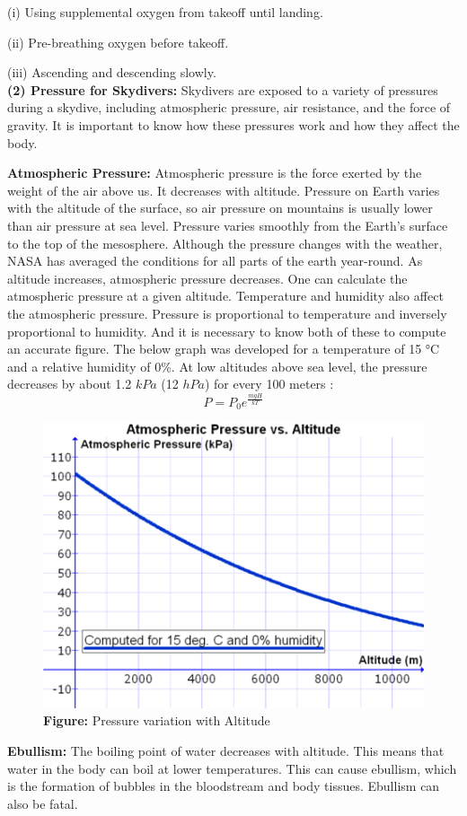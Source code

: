 \documentclass[a4paper, 14pt]{extarticle}
\begin{document}
\textup{(i)} Using supplemental oxygen from takeoff until landing.

\textup{(ii)} Pre-breathing oxygen before takeoff.

\textup{(iii)} Ascending and descending slowly.\\
\textbf{(2) Pressure for Skydivers:}
Skydivers are exposed to a variety of pressures during a skydive, including atmospheric pressure, air resistance, and the force of gravity. It is important to know how these pressures work and how they affect the body.

\textbf{Atmospheric Pressure:}
Atmospheric pressure is the force exerted by the weight of the air above us. It decreases with altitude.
Pressure on Earth varies with the altitude of the surface, so air pressure on mountains is usually lower than air pressure at sea level. Pressure varies smoothly from the Earth's surface to the top of the mesosphere. Although the pressure changes with the weather, NASA has averaged the conditions for all parts of the earth year-round. As altitude increases, atmospheric pressure decreases. One can calculate the atmospheric pressure at a given altitude. Temperature and humidity also affect the atmospheric pressure. Pressure is proportional to temperature and inversely proportional to humidity. And it is necessary to know both of these to compute an accurate figure. The below graph was developed for a temperature of 15 °C and a relative humidity of 0\%. At low altitudes above sea level, the pressure decreases by about 1.2 $kPa$ (12 $hPa$) for every 100 meters\citep{springerBarometricFormula} :
$$P=P_0e^{  \frac{mgH}{kT}  }$$
\begin{figure}[H]
\centering
\includegraphics[width=0.6\linewidth]{baroform.png}
\caption*{\textbf{Figure:} Pressure variation with Altitude}
\end{figure}
\textbf{Ebullism:} The boiling point of water decreases with altitude. This means that water in the body can boil at lower temperatures. This can cause ebullism, which is the formation of bubbles in the bloodstream and body tissues. Ebullism can also be fatal.
\end{document}
